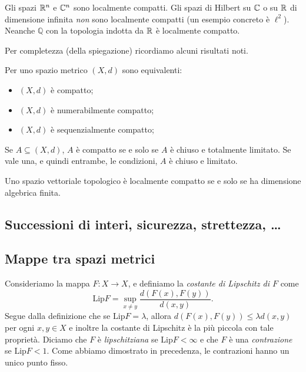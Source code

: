 \begin{esempio}
	Gli spazi $\mathbb{R}^{n}$ e $\mathbb{C}^{n}$ sono localmente compatti. Gli spazi di Hilbert su $\mathbb{C}$ o su $\mathbb{R}$ di dimensione infinita \emph{non} sono localmente compatti (un esempio concreto è $\ell^{2}$). Neanche $\mathbb{Q}$ con la topologia indotta da $\mathbb{R}$ è localmente compatto. 
\end{esempio}

	Per completezza (della spiegazione) ricordiamo alcuni risultati noti.

\begin{teorema}
	Per uno spazio metrico $(X,d)$ sono equivalenti:
	\begin{itemize}
		\item $(X,d)$ è compatto; 
		\item $(X,d)$ è numerabilmente compatto; 
		\item $(X,d)$ è sequenzialmente compatto; 
	\end{itemize}
\end{teorema}

\begin{teorema}
	Se $A\subseteq(X,d)$, $A$ è compatto se e solo se $A$ è chiuso e totalmente limitato. Se vale una, e quindi entrambe, le condizioni, $A$ è chiuso e limitato. 
\end{teorema}

\begin{teorema}
	Uno spazio vettoriale topologico è localmente compatto se e solo se ha dimensione algebrica finita. 
\end{teorema}

\subsection{Successioni di interi, sicurezza, strettezza, \dots}

\subsection{Mappe tra spazi metrici}

	Consideriamo la mappa $F:X\to X$, e definiamo la \emph{costante di Lipschitz di $F$} come 
$$\text{Lip}F = \sup_{x\neq y}\frac{d(F(x), F(y))}{d(x,y)}.$$
Segue dalla definizione che se $\text{Lip}F = \lambda$, allora $d(F(x),F(y))\leq\lambda d(x,y)$ per ogni $x,y\in X$ e inoltre la costante di Lipschitz è la più piccola con tale proprietà. 
	Diciamo che $F$ è \emph{lipschitziana} se $\text{Lip}F<\infty$ e che $F$ è una \emph{contrazione} se $\text{Lip}F < 1$.
Come abbiamo dimostrato in precedenza, le contrazioni hanno un unico punto fisso. 

